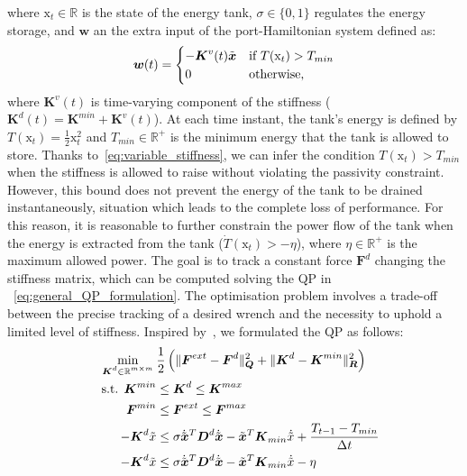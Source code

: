 where $\textrm{x}_t \in \mathbb{R}$ is the state of the energy tank, $\sigma \in \{0,1\}$ regulates the energy storage, and $\boldsymbol{w}$ an the extra input of the port-Hamiltonian system defined as:
\begin{equation} \label{eq:variable_stiffness}
    \boldsymbol{w}(t) = \begin{cases} -\boldsymbol{K}^v(t)\Tilde{\boldsymbol{x}} & \mbox{if $T(\textrm{x}_t)>T_{min}$}  \\ 0 & \mbox{otherwise,} \end{cases}
\end{equation}
where $\boldsymbol{K}^v(t)$ is time-varying component of the stiffness
($\boldsymbol{K}^d(t) = \boldsymbol{K}^{min} + \boldsymbol{K}^v(t)$).
At each time instant, the tank's energy is defined by
$T(\textrm{x}_t)=\frac{1}{2}\textrm{x}_t^2$ and
$T_{min}\in\mathbb{R}^+$ is the minimum energy that the tank is
allowed to store. Thanks to~\eqref{eq:variable_stiffness}, we can
infer the condition $T(\textrm{x}_t)>T_{min}$ when the stiffness is
allowed to raise without violating the passivity constraint. However,
this bound does not prevent the energy of the tank to be drained
instantaneously, situation which leads to the complete loss of
performance. For this reason, it is reasonable to further constrain
the power flow of the tank when the energy is extracted from the tank
($\dot{T}(\textrm{x}_t) > - \eta \nonumber$), where
$\eta\in\mathbb{R}^+$ is the maximum allowed power.
The goal is to track a constant force $\boldsymbol{F}^d$ changing the stiffness matrix, which can be computed solving the QP in ~\eqref{eq:general_QP_formulation}. The optimisation problem involves a trade-off between the precise tracking of a desired wrench and the necessity to uphold a limited level of stiffness.
Inspired by~\cite{zhao2022hybrid}, we formulated the QP as follows:
\begin{align}
    \min_{\substack{\boldsymbol{K}^d \in \mathbb{R}^{m \times m} }} \: & \frac{1}{2} \left( \| \boldsymbol{F}^{ext} - \boldsymbol{F}^{d} \|_{\boldsymbol{Q}}^2 + \| \boldsymbol{K}^{d} - \boldsymbol{K}^{min} \|_{\boldsymbol{R}}^2 \right) \nonumber \\ 
    \quad  \text{s.t.   } \boldsymbol{K}^{min} &\le \boldsymbol{K}^d \le \boldsymbol{K}^{max} \nonumber \\
    \boldsymbol{F}^{min} &\le \boldsymbol{F}^{ext} \le \boldsymbol{F}^{max} \label{eq:general_QP_formulation} \\
    - \boldsymbol{K}^d \Tilde{x} &\leq \sigma \dot{\Tilde{\boldsymbol{x}}}^T \boldsymbol{D}^d \dot{\Tilde{\boldsymbol{x}}} - \Tilde{\boldsymbol{x}}^T 
    \boldsymbol{K}_{min} \dot{\Tilde{x}} + \frac{ T_{t-1} - T_{min}}{\Delta t} \nonumber \\
    - \boldsymbol{K}^d \Tilde{x} &\leq \sigma \dot{\Tilde{\boldsymbol{x}}}^T \boldsymbol{D}^d \dot{\Tilde{\boldsymbol{x}}} - \Tilde{\boldsymbol{x}}^T 
    \boldsymbol{K}_{min} \dot{\Tilde{x}} - \eta \nonumber
\end{align}
